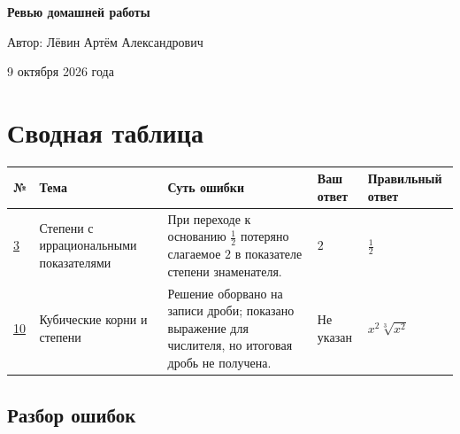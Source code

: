 \documentclass[11pt,a4paper]{article}
\begin{document}
\begin{titlepage}
\thispagestyle{empty}
\vspace*{48mm}
\begin{center}
{\Huge\bfseries Ревью домашней работы\par}
\vspace{23mm}
{\Large Автор: Лёвин Артём Александрович\par}
\vspace{10mm}
{\large 9 октября 2026 года\par}
\end{center}
\vfill
\begin{center}
\end{center}
\vspace{8mm}
\end{titlepage}

\clearpage
\section*{Сводная таблица}
\small
\begin{center}
\begin{tabular}{@{}>{\raggedright\arraybackslash}p{0.9cm}>{\raggedright\arraybackslash}p{2.9cm}>{\raggedright\arraybackslash}p{4.5cm}>{\raggedright\arraybackslash}p{2.1cm}>{\raggedright\arraybackslash}p{3.2cm}@{}}
\toprule
\textbf{№} & \textbf{Тема} & \textbf{Суть ошибки} & \textbf{Ваш ответ} & \textbf{Правильный ответ}\\
\midrule
\hyperref[task:3]{3} & Степени с иррациональными показателями & При переходе к основанию $\frac12$ потеряно слагаемое $2$ в показателе степени знаменателя. & $2$ & $\frac12$\\
\addlinespace[6pt]
\hyperref[task:10]{10} & Кубические корни и степени & Решение оборвано на записи дроби; показано выражение для числителя, но итоговая дробь не получена. & Не указан & $x^2\sqrt[3]{x^2}$\\
\bottomrule
\end{tabular}
\end{center}
\normalsize

\clearpage
\vspace*{\fill}
\begin{center}
\section*{Разбор ошибок}
\end{center}
\vspace*{\fill}
\clearpage
\end{document}
